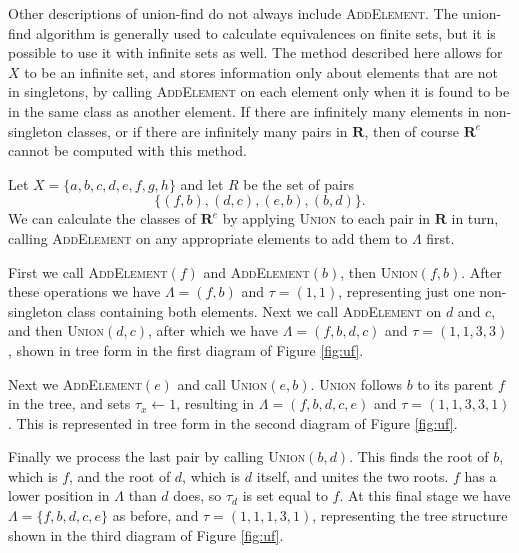 Other descriptions of union-find do not always include \textsc{AddElement}.  The
union-find algorithm is generally used to calculate equivalences on finite sets,
but it is possible to use it with infinite sets as well.  The method described
here allows for $X$ to be an infinite set, and stores information only about
elements that are not in singletons, by calling \textsc{AddElement} on each
element only when it is found to be in the same class as another element.  If
there are infinitely many elements in non-singleton classes, or if there are
infinitely many pairs in $\mathbf{R}$, then of course $\mathbf{R}^e$ cannot be
computed with this method.

\begin{example}
  \label{ex:uf}
  Let $X = \{a,b,c,d,e,f,g,h\}$ and let $R$ be the set of pairs
  $$\{(f,b), (d,c), (e,b), (b,d)\}.$$
  We can calculate the classes of $\mathbf{R}^e$ by applying \textsc{Union} to
  each pair in $\mathbf{R}$ in turn, calling \textsc{AddElement} on any
  appropriate elements to add them to $\Lambda$ first.

  First we call \textsc{AddElement}$(f)$ and \textsc{AddElement}$(b)$, then
  \textsc{Union}$(f,b)$.  After these operations we have $\Lambda = (f,b)$ and
  $\tau = (1,1)$, representing just one non-singleton class containing both
  elements.  Next we call \textsc{AddElement} on $d$ and $c$, and then
  \textsc{Union}$(d,c)$, after which we have $\Lambda = (f,b,d,c)$ and
  $\tau = (1,1,3,3)$, shown in tree form in the first diagram of Figure
  \ref{fig:uf}.

  Next we \textsc{AddElement}$(e)$ and call \textsc{Union}$(e,b)$.
  \textsc{Union} follows $b$ to its parent $f$ in the tree, and sets
  $\tau_x \gets 1$, resulting in $\Lambda = (f,b,d,c,e)$ and
  $\tau = (1,1,3,3,1)$.  This is represented in tree form in the second diagram
  of Figure \ref{fig:uf}.

  Finally we process the last pair by calling \textsc{Union}$(b,d)$.  This finds
  the root of $b$, which is $f$, and the root of $d$, which is $d$ itself, and
  unites the two roots.  $f$ has a lower position in $\Lambda$ than $d$ does, so
  $\tau_d$ is set equal to $f$.  At this final stage we have
  $\Lambda = \{f,b,d,c,e\}$ as before, and $\tau = (1,1,1,3,1)$, representing
  the tree structure shown in the third diagram of Figure \ref{fig:uf}.


\end{example}
